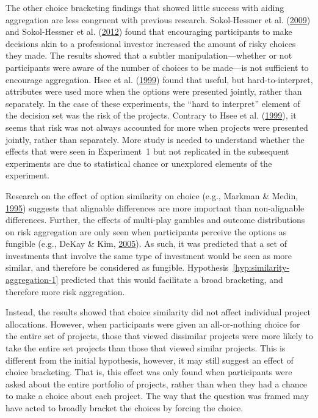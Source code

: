 \documentclass[
  english,
  man, donotrepeattitle,floatsintext]{apa7}
\theoremstyle{definition}
\theoremstyle{definition}
\theoremstyle{definition}
\theoremstyle{definition}
\theoremstyle{remark}
\begin{document}
The other choice bracketing findings that showed little success with aiding
aggregation are less congruent with previous research. Sokol-Hessner et al. (\protect\hyperlink{ref-sokolhessner2009}{2009}) and
Sokol-Hessner et al. (\protect\hyperlink{ref-sokolhessner2012}{2012}) found that encouraging participants to make decisions akin to
a professional investor increased the amount of risky choices they made. The
results showed that a subtler manipulation---whether or not participants were
aware of the number of choices to be made---is not sufficient to encourage
aggregation. Hsee et al. (\protect\hyperlink{ref-hsee1999}{1999}) found that useful, but hard-to-interpret, attributes were
used more when the options were presented jointly, rather than separately. In
the case of these experiments, the ``hard to interpret'' element of the decision
set was the risk of the projects. Contrary to Hsee et al. (\protect\hyperlink{ref-hsee1999}{1999}), it seems that risk was
not always accounted for more when projects were presented jointly, rather than
separately. More study is needed to understand whether the effects that were
seen in Experiment~1 but not replicated in the subsequent experiments are due to
statistical chance or unexplored elements of the experiment.

Research on the effect of option similarity on choice (e.g., Markman \& Medin, \protect\hyperlink{ref-markman1995}{1995})
suggests that alignable differences are more important than non-alignable
differences. Further, the effects of multi-play gambles and outcome
distributions on risk aggregation are only seen when participants perceive the
options as fungible (e.g., DeKay \& Kim, \protect\hyperlink{ref-dekay2005}{2005}). As such, it was predicted that a set of
investments that involve the same type of investment would be seen as more
similar, and therefore be considered as fungible.
Hypothesis~\ref{hyp:similarity-aggregation-1} predicted that this would
facilitate a broad bracketing, and therefore more risk aggregation.

Instead, the results showed that choice similarity did not affect individual
project allocations. However, when participants were given an all-or-nothing
choice for the entire set of projects, those that viewed dissimilar projects
were more likely to take the entire set projects than those that viewed similar
projects. This is different from the initial hypothesis, however, it may still
suggest an effect of choice bracketing. That is, this effect was only found when
participants were asked about the entire portfolio of projects, rather than when
they had a chance to make a choice about each project. The way that the question
was framed may have acted to broadly bracket the choices by forcing the choice.
\end{document}
